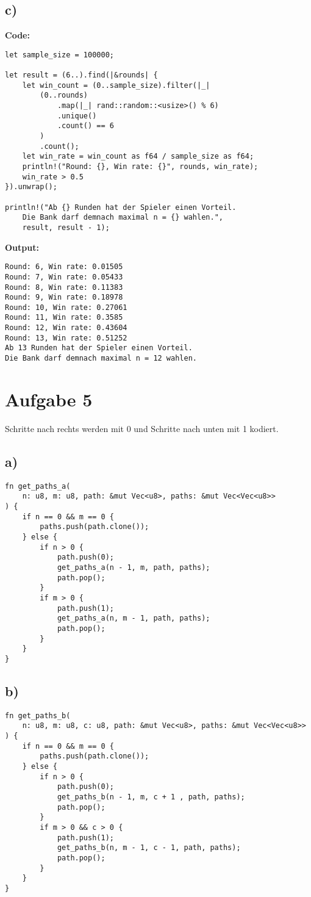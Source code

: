 \documentclass[a4paper]{scrartcl}
\begin{document}
\subsection*{c)}
\textbf{Code:}
\begin{lstlisting}
let sample_size = 100000;

let result = (6..).find(|&rounds| {
    let win_count = (0..sample_size).filter(|_| 
        (0..rounds)
            .map(|_| rand::random::<usize>() % 6)
            .unique()
            .count() == 6
        )
        .count();
    let win_rate = win_count as f64 / sample_size as f64;
    println!("Round: {}, Win rate: {}", rounds, win_rate);
    win_rate > 0.5
}).unwrap();

println!("Ab {} Runden hat der Spieler einen Vorteil. 
    Die Bank darf demnach maximal n = {} wahlen.", 
    result, result - 1);
\end{lstlisting}

\textbf{Output:}
\begin{lstlisting}
Round: 6, Win rate: 0.01505
Round: 7, Win rate: 0.05433
Round: 8, Win rate: 0.11383
Round: 9, Win rate: 0.18978
Round: 10, Win rate: 0.27061
Round: 11, Win rate: 0.3585
Round: 12, Win rate: 0.43604
Round: 13, Win rate: 0.51252
Ab 13 Runden hat der Spieler einen Vorteil. 
Die Bank darf demnach maximal n = 12 wahlen.
\end{lstlisting}

\section*{Aufgabe 5}
Schritte nach rechts werden mit 0 und Schritte nach unten mit 1 kodiert.
\subsection*{a)}
\begin{lstlisting}
fn get_paths_a(
    n: u8, m: u8, path: &mut Vec<u8>, paths: &mut Vec<Vec<u8>>
) {
    if n == 0 && m == 0 {
        paths.push(path.clone());
    } else {
        if n > 0 {
            path.push(0);
            get_paths_a(n - 1, m, path, paths);
            path.pop();
        }
        if m > 0 {
            path.push(1);
            get_paths_a(n, m - 1, path, paths);
            path.pop();
        }
    }
}
\end{lstlisting}

\subsection*{b)}
\begin{lstlisting}
fn get_paths_b(
    n: u8, m: u8, c: u8, path: &mut Vec<u8>, paths: &mut Vec<Vec<u8>>
) {
    if n == 0 && m == 0 {
        paths.push(path.clone());
    } else {
        if n > 0 {
            path.push(0);
            get_paths_b(n - 1, m, c + 1 , path, paths);
            path.pop();
        }
        if m > 0 && c > 0 {
            path.push(1);
            get_paths_b(n, m - 1, c - 1, path, paths);
            path.pop();
        }
    }
}
\end{lstlisting}    
\end{document}
